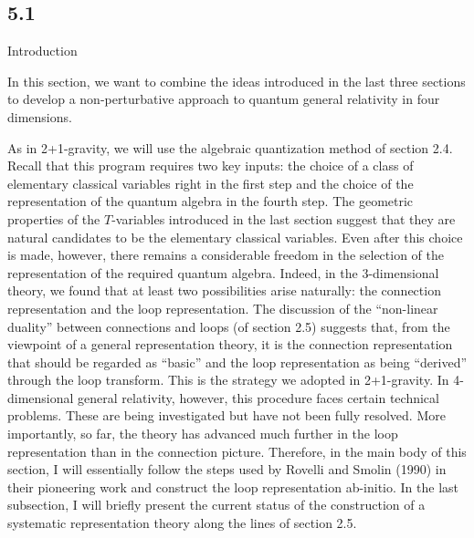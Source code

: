 \subsection{5.1}{Introduction}%

In this section, we want to combine the ideas introduced in the last
three sections to develop a non-perturbative approach to quantum general
relativity in four dimensions.

As in 2+1-gravity, we will use the algebraic quantization
method of section 2.4. Recall that this program requires two
key inputs: the choice of a class of elementary classical variables right
in the first step and the choice of the representation of the quantum
algebra in the fourth step. The geometric properties of the $T$-variables
introduced in the last section suggest that they are natural candidates to
be the elementary classical variables. Even after this choice is made,
however, there remains a considerable freedom in the selection of the
representation of the required quantum algebra. Indeed, in the 3-dimensional
theory, we found that at least two possibilities arise naturally: the
connection representation and the loop representation. The discussion of
the ``non-linear duality'' between connections and loops (of section 2.5)
suggests that, from the viewpoint of a general representation theory, it
is the connection representation that should be regarded as ``basic'' and
the loop representation as  being ``derived'' through the loop transform.
This is the strategy we adopted in 2+1-gravity. In
4-dimensional general relativity, however, this procedure faces certain
technical problems. These are being investigated but have not been fully
resolved. More importantly, so far, the theory has advanced much
further in the loop representation than in the connection picture.
Therefore, in the main body of this section, I will essentially follow
the steps used by Rovelli and Smolin (1990) in their pioneering work
and construct the loop representation ab-initio. In the last subsection,
I will briefly present the current status of the construction of a systematic
representation theory along the lines of section 2.5.

